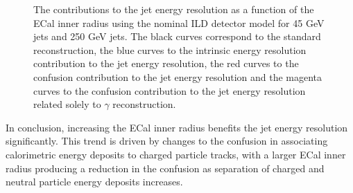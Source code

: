 \begin{figure}[h!]
\caption[The contributions to the jet energy resolution as a function of the ECal inner radius using the nominal ILD detector model for \protect{} 45 GeV jets and \protect{} 250 GeV jets.  The black curves correspond to the standard reconstruction, the blue curves to the intrinsic energy resolution contribution to the jet energy resolution, the red curves to the confusion contribution to the jet energy resolution and the magenta curves to the confusion contribution to the jet energy resolution related solely to $\gamma$ reconstruction.]{The contributions to the jet energy resolution as a function of the ECal inner radius using the nominal ILD detector model for \protect{} 45 GeV jets and \protect{} 250 GeV jets.  The black curves correspond to the standard reconstruction, the blue curves to the intrinsic energy resolution contribution to the jet energy resolution, the red curves to the confusion contribution to the jet energy resolution and the magenta curves to the confusion contribution to the jet energy resolution related solely to $\gamma$ reconstruction.}
\label{fig:ecalinnerrbreak}
\end{figure}

In conclusion, increasing the ECal inner radius benefits the jet energy resolution significantly.  This trend is driven by changes to the confusion in associating calorimetric energy deposits to charged particle tracks, with a larger ECal inner radius producing a reduction in the confusion as separation of charged and neutral particle energy deposits increases.  
